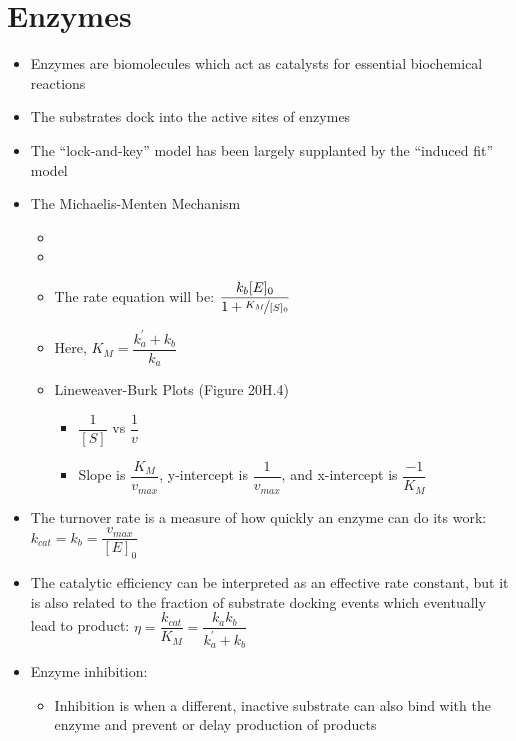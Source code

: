 \documentclass[12pt, openany, letterpaper]{memoir}
\begin{document}
\section{Enzymes}
\begin{itemize}
	\item Enzymes are biomolecules which act as catalysts for essential biochemical reactions
	\item The substrates dock into the active sites of enzymes
	\item The “lock-and-key” model has been largely supplanted by the “induced fit” model
	\item The Michaelis-Menten Mechanism
	      \begin{itemize}
		      \item {}
		      \item {}
		      \item The rate equation will be: $\dfrac{k_b[E]_0}{1 + \nicefrac{K_M}{[S]_0}}$
		      \item Here, $K_M = \dfrac{k_a^\prime+k_b}{k_a}$
		      \item Lineweaver-Burk Plots (Figure 20H.4)
		            \begin{itemize}
			            \item $\dfrac{1}{[S]}$ vs $\dfrac{1}{v}$
			            \item Slope is $\dfrac{K_M}{v_{max}}$, y-intercept is $\dfrac{1}{v_{max}}$, and x-intercept is $\dfrac{-1}{K_M}$
		            \end{itemize}
	      \end{itemize}
	\item The turnover rate is a measure of how quickly an enzyme can do its work: $k_{cat}=k_b=\dfrac{v_{max}}{[E]_0}$
	\item The catalytic efficiency can be interpreted as an effective rate constant, but it is also related to the fraction of substrate docking events which eventually lead to product: $\eta = \dfrac{k_{cat}}{K_M}=\dfrac{k_ak_b}{k_a^\prime+k_b}$
	\item Enzyme inhibition:
	      \begin{itemize}
		      \item Inhibition is when a different, inactive substrate can also bind with the enzyme and prevent or delay production of products



\end{itemize}
\end{itemize}
\end{document}
